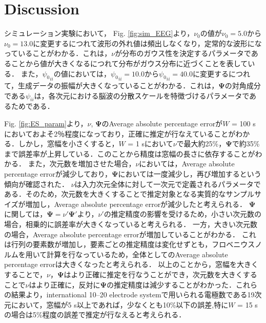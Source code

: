 \documentclass[journal]{IEEEtran}
\begin{document}
\section{Discussion}
シミュレーション実験において，
Fig. \ref{fig:sim_EEG}より，$\nu_0$の値が$\nu_0 = 5.0$から$\nu_0 = 13.0$に変更するにつれて波形の外れ値は頻出しなくなり，定常的な波形になっていることがわかる．これは，$\nu$が分布のガウス性を決定するパラメータであることから値が大きくなるにつれて分布がガウス分布に近づくことを表している．
また，${\psi_0}_{ii}$の値においては，${\psi_0}_{ii}=10.0$から${\psi_0}_{ii}=40.0$に変更するにつれて，生成データの振幅が大きくなっていることがわかる．これは，$\mathbf{\Psi}$の対角成分である$\psi_{ii}$は，各次元における脳波の分散スケールを特徴づけるパラメータであるためである．

Fig. \ref{fig:ES_param}より，$\nu$, $\mathbf{\Psi}$のAverage absolute percentage errorが$W$ = 100 sにおいておよそ2％程度になっており，正確に推定が行なえていることがわかる．しかし，窓幅を小さくすると，$W$ = 1 sにおいて$\nu$で最大約25\%，$\mathbf{\Psi}$で約35\%まで誤差率が上昇している．このことから精度は窓幅の長さに依存することがわかる．
また，次元数を増加させた場合，$\nu$においては，Average absolute percentage errorが減少しており，$\mathbf{\Psi}$においては一度減少し，再び増加するという傾向が確認された．
$\nu$は入力次元全体に対して一次元で定義されるパラメータである．そのため，次元数を大きくすることで推定対象となる実質的なサンプルサイズが増加し，Average absolute percentage errorが減少したと考えられる．
$\mathbf{\Psi}$に関しては，$\mathbf{\Psi} = \nu' \mathbf{\Psi}'$より，$\nu'$の推定精度の影響を受けるため，小さい次元数の場合，相乗的に誤差率が大きくなっていると考えられる．
一方，大きい次元数の場合，Average absolute percentage errorが増加していることがわかる．
これは行列の要素数が増加し，要素ごとの推定精度は変化せずとも，フロベニウスノルムを用いて計算を行なっているため，全体としてのAverage absolute percentage errorは大きくなったと考えられる．
以上のことから，窓幅を大きくすることで，$\nu$，$\mathbf{\Psi}$はより正確に推定を行なうことができ，次元数を大きくすることで$\nu$はより正確に，反対に$\mathbf{\Psi}$の推定精度は減少することがわかった．これらの結果より，international 10--20 electrode systemで用いられる電極数である19次元において，窓幅が5 s以上であれば，少なくとも10\%以下の誤差,特に$W$ = 15 sの場合は5\%程度の誤差で推定が行なえると考えられる．
\end{document}
